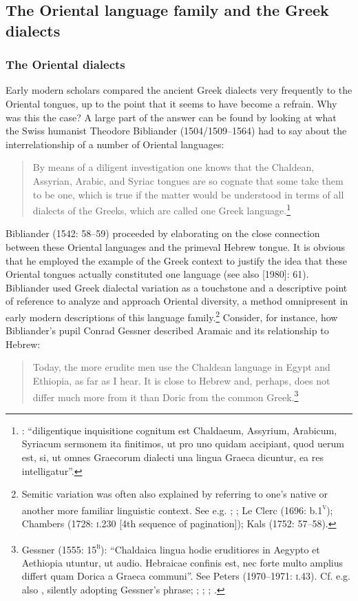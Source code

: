 \subsection{The Oriental language family and the Greek dialects}
\hypertarget{Toc19704864}{}\subsubsection{The Oriental dialects}
\hypertarget{Toc19704865}{}
Early modern scholars compared the ancient Greek dialects very frequently to the Oriental tongues, up to the point that it seems to have become a refrain. Why was this the case? A large part of the answer can be found by looking at what the Swiss humanist Theodore Bibliander (1504/1509–1564) had to say about the interrelationship of a number of Oriental languages:

\begin{quote}
By means of a diligent investigation one knows that the Chaldean, Assyrian, Arabic, and Syriac tongues are so cognate that some take them to be one, which is true if the matter would be understood in terms of all dialects of the Greeks, which are called one Greek language.\footnote{\citet[58]{Bibliander1542}: “diligentique inquisitione cognitum est Chaldaeum, Assyrium, Arabicum, Syriacum sermonem ita finitimos, ut pro uno quidam accipiant, quod uerum est, si, ut omnes Graecorum dialecti una lingua Graeca dicuntur, ea res intelligatur”.}
\end{quote}

Bibliander (1542: 58–59) proceeded by elaborating on the close connection between these Oriental languages and the primeval Hebrew tongue. It is obvious that he employed the example of the Greek context to justify the idea that these Oriental tongues actually constituted one language (see also \citealt{Metcalf2013} [1980]: 61). Bibliander used Greek dialectal variation as a touchstone and a descriptive point of reference to analyze and approach Oriental diversity, a method omnipresent in early modern descriptions of this language family.\footnote{Semitic variation was often also explained by referring to one’s native or another more familiar linguistic context. See e.g. \citet[41]{Purchas1613}; \citet[197]{Kircher1679}; Le Clerc (1696: b.1\textsc{\textsuperscript{v}}); Chambers (1728: \textsc{i.}230 [4th sequence of pagination]); Kals (1752: 57–58).} Consider, for instance, how Bibliander’s pupil Conrad Gessner described Aramaic and its relationship to Hebrew:

\begin{quote}
Today, the more erudite men use the Chaldean language in Egypt and Ethiopia, as far as I hear. It is close to Hebrew and, perhaps, does not differ much more from it than Doric from the common Greek.\footnote{Gessner (1555: 15\textsc{\textsuperscript{r}}): “Chaldaica lingua hodie eruditiores in Aegypto et Aethiopia utuntur, ut audio. Hebraicae confinis est, nec forte multo amplius differt quam Dorica a Graeca communi”. See Peters (1970–1971: \textsc{i.}43). Cf. e.g. also \citet[325]{Rocca1591}, silently adopting Gessner’s phrase; \citet[459]{Saumaise1643a}; \citet[88]{Bagnati1732}; \citet[24]{Wesley1736}; \citet[22]{Eichhorn1780}.}
\end{quote}


